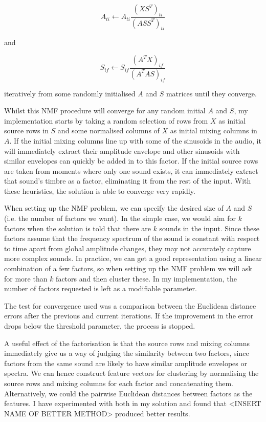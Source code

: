 \documentclass[10pt,twoside,a4paper]{report}
\begin{document}
\begin{equation}
A_{ti} \leftarrow A_{ti} \frac{\left( X S^T \right)_{ti}}{\left( A S S^T \right)_{ti}}
\end{equation}

and

\begin{equation}
S_{if} \leftarrow S_{if} \frac{\left( A^T X \right)_{if}}{\left( A^T A S \right)_{if}}
\end{equation}

iteratively from some randomly initialised $ A $ and $ S $ matrices until they converge.

Whilst this NMF procedure will converge for any random initial $ A $ and $ S $, my implementation starts by taking a random selection of rows from $ X $ as initial source rows in $ S $ and some normalised columns of $ X $ as initial mixing columns in $ A $. If the initial mixing columns line up with some of the sinusoids in the audio, it will immediately extract their amplitude envelope and other sinusoids with similar envelopes can quickly be added in to this factor. If the initial source rows are taken from moments where only one sound exists, it can immediately extract that sound's timbre as a factor, eliminating it from the rest of the input. With these heuristics, the solution is able to converge very rapidly.

When setting up the NMF problem, we can specify the desired size of $ A $ and $ S $ (i.e. the number of factors we want). In the simple case, we would aim for $ k $ factors when the solution is told that there are $ k $ sounds in the input. Since these factors assume that the frequency spectrum of the sound is constant with respect to time apart from global amplitude changes, they may not accurately capture more complex sounds. In practice, we can get a good representation using a linear combination of a few factors, so when setting up the NMF problem we will ask for more than $ k $ factors and then cluster these. In my implementation, the number of factors requested is left as a modifiable parameter.

The test for convergence used was a comparison between the Euclidean distance errors after the previous and current iterations. If the improvement in the error drops below the threshold parameter, the process is stopped.

A useful effect of the factorisation is that the source rows and mixing columns immediately give us a way of judging the similarity between two factors, since factors from the same sound are likely to have similar amplitude envelopes or spectra. We can hence construct feature vectors for clustering by normalising the source rows and mixing columns for each factor and concatenating them. Alternatively, we could the pairwise Euclidean distances between factors as the features. I have experimented with both in my solution and found that <INSERT NAME OF BETTER METHOD> produced better results.
\end{document}
